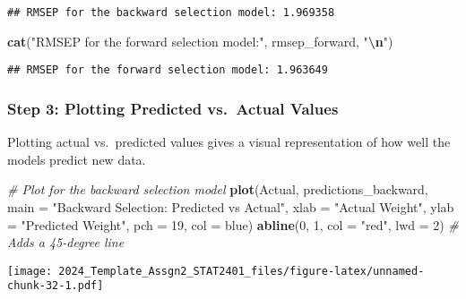\documentclass[
]{article}
\newenvironment{Shaded}{\begin{snugshade}}{\end{snugshade}}
\newcommand{\AttributeTok}[1]{\textcolor[rgb]{0.13,0.29,0.53}{#1}}
\newcommand{\CommentTok}[1]{\textcolor[rgb]{0.56,0.35,0.01}{\textit{#1}}}
\newcommand{\DecValTok}[1]{\textcolor[rgb]{0.00,0.00,0.81}{#1}}
\newcommand{\FunctionTok}[1]{\textcolor[rgb]{0.13,0.29,0.53}{\textbf{#1}}}
\newcommand{\NormalTok}[1]{#1}
\newcommand{\SpecialCharTok}[1]{\textcolor[rgb]{0.81,0.36,0.00}{\textbf{#1}}}
\newcommand{\StringTok}[1]{\textcolor[rgb]{0.31,0.60,0.02}{#1}}
\begin{document}
\begin{verbatim}
## RMSEP for the backward selection model: 1.969358
\end{verbatim}

\begin{Shaded}
\begin{Highlighting}[]
\FunctionTok{cat}\NormalTok{(}\StringTok{"RMSEP for the forward selection model:"}\NormalTok{, rmsep\_forward, }\StringTok{"}\SpecialCharTok{\textbackslash{}n}\StringTok{"}\NormalTok{)}
\end{Highlighting}
\end{Shaded}

\begin{verbatim}
## RMSEP for the forward selection model: 1.963649
\end{verbatim}

\hypertarget{step-3-plotting-predicted-vs.-actual-values}{%
\subsubsection{Step 3: Plotting Predicted vs.~Actual
Values}\label{step-3-plotting-predicted-vs.-actual-values}}

Plotting actual vs.~predicted values gives a visual representation of
how well the models predict new data.

\begin{Shaded}
\begin{Highlighting}[]
\CommentTok{\# Plot for the backward selection model}
\FunctionTok{plot}\NormalTok{(Actual, predictions\_backward, }\AttributeTok{main =} \StringTok{"Backward Selection: Predicted vs Actual"}\NormalTok{,}
     \AttributeTok{xlab =} \StringTok{"Actual Weight"}\NormalTok{, }\AttributeTok{ylab =} \StringTok{"Predicted Weight"}\NormalTok{, }\AttributeTok{pch =} \DecValTok{19}\NormalTok{, }\AttributeTok{col =} \StringTok{\textquotesingle{}blue\textquotesingle{}}\NormalTok{)}
\FunctionTok{abline}\NormalTok{(}\DecValTok{0}\NormalTok{, }\DecValTok{1}\NormalTok{, }\AttributeTok{col =} \StringTok{"red"}\NormalTok{, }\AttributeTok{lwd =} \DecValTok{2}\NormalTok{)  }\CommentTok{\# Adds a 45{-}degree line}
\end{Highlighting}
\end{Shaded}

\texttt{[image: 2024\_Template\_Assgn2\_STAT2401\_files/figure-latex/unnamed-chunk-32-1.pdf]}
\end{document}
